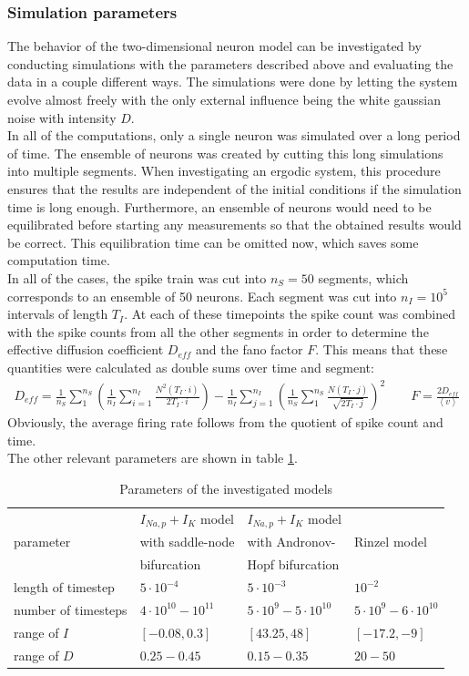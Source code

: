 \documentclass[12pt,a4paper]{article}
\begin{document}
\subsubsection{Simulation parameters}
The behavior of the two-dimensional neuron model can be investigated by conducting simulations with the parameters described above and evaluating the data in a couple different ways. The simulations were done by letting the system evolve almost freely with the only external influence being the white gaussian noise with intensity $D$. \\
In all of the computations, only a single neuron was simulated over a long period of time. The ensemble of neurons was created by cutting this long simulations into multiple segments. When investigating an ergodic system, this procedure ensures that the results are independent of the initial conditions if the simulation time is long enough. Furthermore, an ensemble of neurons would need to be equilibrated before starting any measurements so that the obtained results would be correct. This equilibration time can be omitted now, which saves some computation time. \\
In all of the cases, the spike train was cut into $n_S=50$ segments, which corresponds to an ensemble of 50 neurons. Each segment was cut into $n_I=10^5$ intervals of length $T_I$. At each of these timepoints the spike count was combined with the spike counts from all the other segments in order to determine the effective diffusion coefficient $D_{eff}$ and the fano factor $F$. This means that these quantities were calculated as double sums over time and segment:
\begin{align*}
D_{eff}=\frac{1}{n_S}\sum_{1}^{n_S}\left(\frac{1}{n_I}\sum_{i=1}^{n_I}\frac{N^2(T_I\cdot i)}{2T_I\cdot i}\right)-\frac{1}{n_I}\sum_{j=1}^{n_I}\left(\frac{1}{n_S}\sum_{1}^{n_S}\frac{N(T_I\cdot j)}{\sqrt{2T_I\cdot j}}\right)^2\qquad F=\frac{2D_{eff}}{\left<v\right>}
\end{align*}
Obviously, the average firing rate follows from the quotient of spike count and time.\\
The other relevant parameters are shown in table \ref{params}.
\begin{table}[h]

\begin{tabular}{|l|l|l|l|}
	\hline
	 & $I_{Na,p}+I_K$ model  & $I_{Na,p}+I_K$ model & \\ parameter &  with saddle-node & with Andronov- &Rinzel model\\ & bifurcation & Hopf bifurcation &\\
	\hline
	length of timestep&$5\cdot 10^{-4}$&$5\cdot10^{-3}$&$10^{-2}$\\\hline
	number of timesteps&$4\cdot10^{10}-10^{11}$&$5\cdot10^9-5\cdot10^{10}$&$5\cdot10^9-6\cdot10^{10}$\\\hline
	range of $I$&$[-0.08,0.3]$&$[43.25,48]$&$[-17.2,-9]$\\\hline
	range of $D$&$0.25-0.45$&$0.15-0.35$&$20-50$\\
	\hline
\end{tabular}
\caption{Parameters of the investigated models}	
\label{params}
\end{table}
\end{document}
